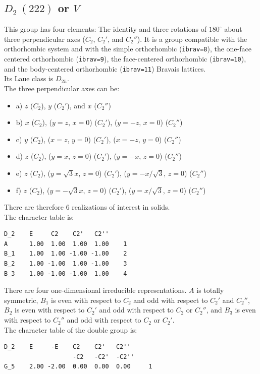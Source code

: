 \documentclass[12pt,a4paper]{article}
\begin{document}
\subsection{\color{web-blue}$D_2\ (222)$ or $V$} 
This group has four elements: The identity and three rotations of $180^\circ$ about 
three perpendicular axes ($C_2$, $C_2'$, and $C_2''$). It is a group compatible with 
the orthorhombic system and with the simple orthorhombic (\texttt{ibrav=8}), 
the one-face centered orthorhombic (\texttt{ibrav=9}), the face-centered orthorhombic 
(\texttt{ibrav=10}), and the body-centered orthorhombic (\texttt{ibrav=11}) Bravais 
lattices. \\ 
Its Laue class is $D_{2h}$. \\
The three perpendicular axes can be: 
\begin{itemize}
\item
a) $z$ ($C_2$), $y$ ($C_2'$), and $x$ ($C_2''$)
\item
b) $x$ ($C_2$), ($y=z$, $x=0$) ($C_2'$), ($y=-z$, $x=0$) ($C_2''$)
\item
c) $y$ ($C_2$), ($x=z$, $y=0$) ($C_2'$), ($x=-z$, $y=0$) ($C_2''$)
\item
d) $z$ ($C_2$), ($y=x$, $z=0$) ($C_2'$), ($y=-x$, $z=0$) ($C_2''$)
\item
e) $z$ ($C_2$), ($y=\sqrt{3}x$, $z=0$) ($C_2'$), ($y=-x/\sqrt{3}$, $z=0$) ($C_2''$)
\item
f) $z$ ($C_2$), ($y=-\sqrt{3}x$, $z=0$) ($C_2'$), ($y=x/\sqrt{3}$, $z=0$) ($C_2''$)
\end{itemize}
There are therefore $6$ realizations of interest in solids. \\
The character table is:
\begin{verbatim}
D_2    E     C2    C2'   C2''
A      1.00  1.00  1.00  1.00    1
B_1    1.00  1.00 -1.00 -1.00    2
B_2    1.00 -1.00  1.00 -1.00    3
B_3    1.00 -1.00 -1.00  1.00    4
\end{verbatim}
There are four one-dimensional irreducible representations.
$A$ is totally symmetric, $B_1$ is even with respect to
$C_2$ and odd with respect to $C_2'$ and $C_2''$, 
$B_2$ is even with respect to $C_2'$ and odd with respect to $C_2$ or $C_2''$,
and $B_3$ is even with respect to $C_2''$ and odd with respect to
$C_2$ or $C_2'$. \\
The character table of the double group is:
\begin{verbatim}
D_2    E     -E    C2    C2'   C2'' 
                   -C2   -C2'  -C2''
G_5    2.00 -2.00  0.00  0.00  0.00     1
\end{verbatim}
\end{document}
